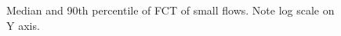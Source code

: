\begin{figure}[t]
\center
{}
\caption{Median and 90th percentile of FCT of small flows. Note log scale on Y axis.}
\label{fig:fct_results}
\end{figure}
\fi


